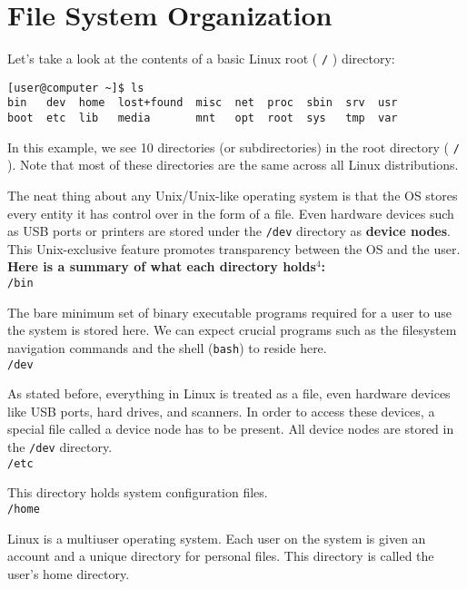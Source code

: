 \documentclass[11pt,oneside]{article}
\newenvironment{articleSectionN}[1]
{#1}
{}
\begin{document}
\section{File System Organization}
\begin{articleSectionN}

\noindent Let's take a look at the contents of a basic Linux root ( \lstinline{/} ) directory:

\begin{lstlisting}
[user@computer ~]$ ls
bin   dev  home  lost+found  misc  net  proc  sbin  srv  usr
boot  etc  lib   media       mnt   opt  root  sys   tmp  var
\end{lstlisting}

In this example, we see 10 directories (or subdirectories) in the root directory ( \lstinline{/} ). Note that most of these directories are the same across all Linux distributions.

The neat thing about any Unix/Unix-like operating system is that the OS stores every entity it has control over in the form of a file. Even hardware devices such as USB ports or printers are stored under the \lstinline{/dev} directory as \textbf{device nodes}. This Unix-exclusive feature promotes transparency between the OS and the user.\\
\newpage
\noindent\textbf{Here is a summary of what each directory holds$^{4}$:}\\

\noindent\lstinline{/bin}

    The bare minimum set of binary executable programs required for a user to use the system is stored here. We can expect crucial programs such as the filesystem navigation commands and the shell (\lstinline{bash}) to reside here.\\
    
\noindent\lstinline{/dev}

    As stated before, everything in Linux is treated as a file, even hardware devices like USB ports, hard drives, and scanners. In order to access these devices, a special file called a device node has to be present. All device nodes are stored in the \lstinline{/dev} directory.\\

\noindent\lstinline{/etc}

    This directory holds system configuration files. \\
    
\noindent\lstinline{/home}

    Linux is a multiuser operating system. Each user on the system is given an account and a unique directory for personal files. This directory is called the user's home directory.\\
    

\end{articleSectionN}
\end{document}
